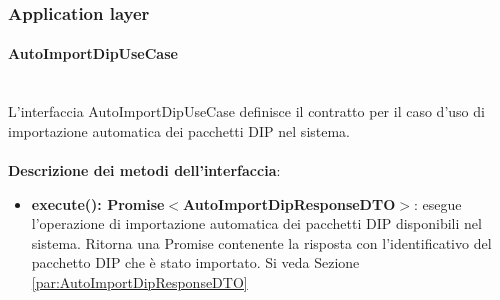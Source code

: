 \documentclass[a4paper,12pt]{article}
\begin{document}
{{            
            \subsubsection{Application layer} 
                \paragraph{AutoImportDipUseCase}\label{par:AutoImportDipUseCase}\mbox{}\\
                L'interfaccia AutoImportDipUseCase definisce il contratto per il caso d'uso di importazione automatica dei pacchetti DIP nel sistema.\\
                \\
              \noindent \textbf{Descrizione dei metodi dell'interfaccia}:
                \begin{itemize}
                    \item \textbf{execute(): Promise$<$AutoImportDipResponseDTO$>$}: esegue l'operazione di importazione automatica dei pacchetti DIP disponibili nel sistema. Ritorna una Promise contenente la risposta con l’identificativo del pacchetto DIP che è stato importato. Si veda Sezione \ref{par:AutoImportDipResponseDTO}
                \end{itemize}
}}
\end{document}

